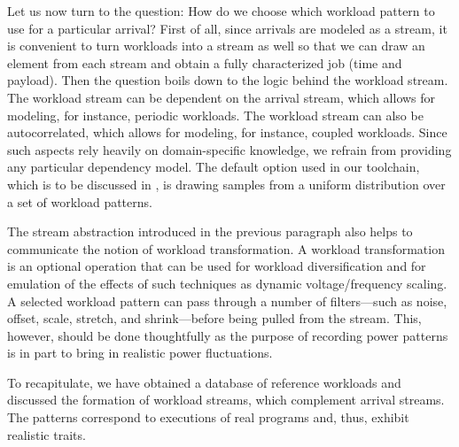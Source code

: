 Let us now turn to the question: How do we choose which workload pattern to use
for a particular arrival? First of all, since arrivals are modeled as a stream,
it is convenient to turn workloads into a stream as well so that we can draw an
element from each stream and obtain a fully characterized job (time and
payload). Then the question boils down to the logic behind the workload stream.
The workload stream can be dependent on the arrival stream, which allows for
modeling, for instance, periodic workloads. The workload stream can also be
autocorrelated, which allows for modeling, for instance, coupled workloads.
Since such aspects rely heavily on domain-specific knowledge, we refrain from
providing any particular dependency model. The default option used in our
toolchain, which is to be discussed in , is drawing samples from
a uniform distribution over a set of workload patterns.

The stream abstraction introduced in the previous paragraph also helps to
communicate the notion of workload transformation. A workload transformation is
an optional operation that can be used for workload diversification and for
emulation of the effects of such techniques as dynamic voltage/frequency
scaling. A selected workload pattern can pass through a number of filters---such
as noise, offset, scale, stretch, and shrink---before being pulled from the
stream. This, however, should be done thoughtfully as the purpose of recording
power patterns is in part to bring in realistic power fluctuations.

To recapitulate, we have obtained a database of reference workloads and
discussed the formation of workload streams, which complement arrival streams.
The patterns correspond to executions of real programs and, thus, exhibit
realistic traits.
